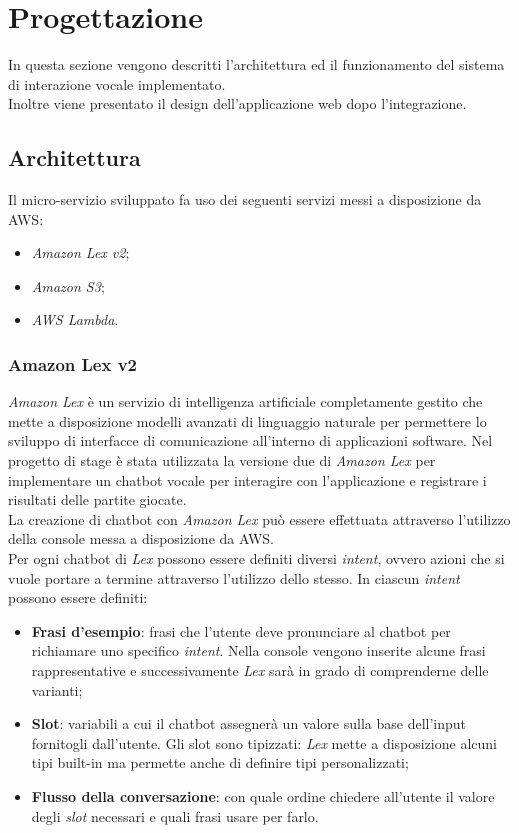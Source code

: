 \section{Progettazione}
In questa sezione vengono descritti l'architettura ed il funzionamento del sistema di interazione vocale implementato. \\ 
Inoltre viene presentato il design dell'applicazione web dopo l'integrazione.
	\subsection{Architettura}
	Il micro-servizio sviluppato fa uso dei seguenti servizi messi a disposizione da \gls{AWS}:
	\begin{itemize}
		\item \emph{Amazon Lex v2};
		\item \emph{Amazon S3};
		\item \emph{AWS Lambda}.
	\end{itemize}
		\subsubsection{Amazon Lex v2}
		\emph{Amazon Lex} è un servizio di intelligenza artificiale completamente gestito che mette a disposizione 
		modelli avanzati di linguaggio naturale per permettere lo sviluppo di interfacce di comunicazione all'interno 
		di applicazioni software. Nel progetto di stage è stata utilizzata la versione due di \emph{Amazon Lex} per 
		implementare un \gls{chatbot} vocale per interagire con l'applicazione e registrare i risultati delle partite 
		giocate. \\
		
		\noindent La creazione di \gls{chatbot} con \emph{Amazon Lex} può essere effettuata attraverso l'utilizzo della console messa a disposizione da \gls{AWS}. \\
		Per ogni \gls{chatbot} di \emph{Lex} possono essere definiti diversi \emph{intent}, ovvero azioni che si
		vuole portare a termine attraverso l'utilizzo dello stesso. In ciascun \emph{intent} possono essere definiti:
		\begin{itemize}
			\item \textbf{Frasi d'esempio}: frasi che l'utente deve pronunciare al \gls{chatbot} per richiamare uno
			specifico \emph{intent}. Nella console vengono inserite alcune frasi rappresentative e successivamente \emph{Lex} sarà in grado di comprenderne delle varianti; 
			\item \textbf{Slot}: variabili a cui il \gls{chatbot} assegnerà un valore sulla base
			dell'input fornitogli dall'utente. Gli slot sono tipizzati:	\emph{Lex} mette a disposizione alcuni tipi built-in ma permette anche di definire tipi personalizzati;
			\item \textbf{Flusso della conversazione}: con quale ordine chiedere all'utente il valore degli \emph{slot} necessari e quali frasi usare per farlo.		
		\end{itemize}
		
